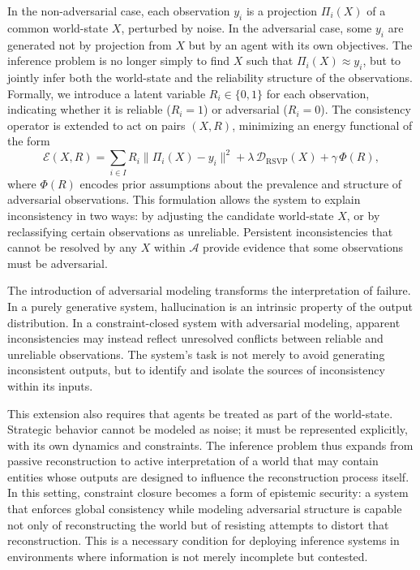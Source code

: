 \documentclass[11pt, oneside]{article}
\begin{document}
In the non-adversarial case, each observation $y_i$ is a projection $\Pi_i(X)$ of a common world-state $X$, perturbed by noise. In the adversarial case, some $y_i$ are generated not by projection from $X$ but by an agent with its own objectives. The inference problem is no longer simply to find $X$ such that $\Pi_i(X) \approx y_i$, but to jointly infer both the world-state and the reliability structure of the observations. Formally, we introduce a latent variable $R_i \in \{0,1\}$ for each observation, indicating whether it is reliable ($R_i = 1$) or adversarial ($R_i = 0$). The consistency operator is extended to act on pairs $(X, R)$, minimizing an energy functional of the form
\[
\mathcal{E}(X, R) = \sum_{i \in I} R_i \|\Pi_i(X) - y_i\|^2 + \lambda \, \mathcal{D}_{\mathrm{RSVP}}(X) + \gamma \, \Phi(R),
\]
where $\Phi(R)$ encodes prior assumptions about the prevalence and structure of adversarial observations. This formulation allows the system to explain inconsistency in two ways: by adjusting the candidate world-state $X$, or by reclassifying certain observations as unreliable. Persistent inconsistencies that cannot be resolved by any $X$ within $\mathcal{A}$ provide evidence that some observations must be adversarial.

The introduction of adversarial modeling transforms the interpretation of failure. In a purely generative system, hallucination is an intrinsic property of the output distribution. In a constraint-closed system with adversarial modeling, apparent inconsistencies may instead reflect unresolved conflicts between reliable and unreliable observations. The system's task is not merely to avoid generating inconsistent outputs, but to identify and isolate the sources of inconsistency within its inputs.

This extension also requires that agents be treated as part of the world-state. Strategic behavior cannot be modeled as noise; it must be represented explicitly, with its own dynamics and constraints. The inference problem thus expands from passive reconstruction to active interpretation of a world that may contain entities whose outputs are designed to influence the reconstruction process itself. In this setting, constraint closure becomes a form of epistemic security: a system that enforces global consistency while modeling adversarial structure is capable not only of reconstructing the world but of resisting attempts to distort that reconstruction. This is a necessary condition for deploying inference systems in environments where information is not merely incomplete but contested.
\end{document}
